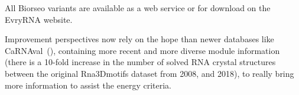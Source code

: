 \documentclass{bioinfo}
\begin{document}
All Biorseo variants are available as a web service or for download on the EvryRNA website.  

Improvement perspectives now rely on the hope than newer databases like CaRNAval~(\citealp{reinharz2018mining}), containing more recent and more diverse module information (there is a 10-fold increase in the number of solved RNA crystal structures between the original Rna3Dmotifs dataset from 2008, and 2018), to really bring more information to assist the energy criteria.\\


%
%
%
%
%


\end{document}

